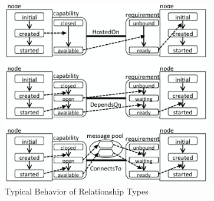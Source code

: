 \documentclass[12pt]{report}
\begin{document}
\begin{figure}
\centering
\includegraphics[height=8cm,natwidth=420,natheight=366]{./exsem.png}
\caption{Typical Behavior of Relationship Types}
\label{fig:examplesem}
\end{figure}
\end{document}
